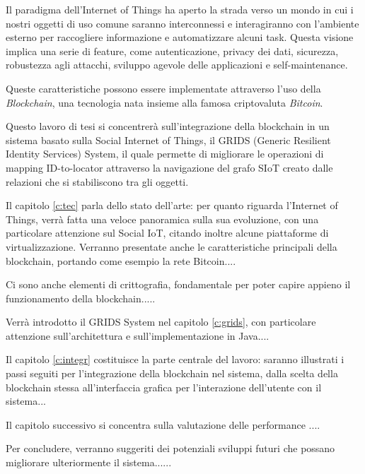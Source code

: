 Il paradigma dell'Internet of Things ha aperto la strada verso un mondo in cui i nostri oggetti di uso comune saranno interconnessi e interagiranno con l'ambiente esterno per raccogliere informazione e automatizzare alcuni task. Questa visione implica una serie di feature, come autenticazione, privacy dei dati, sicurezza, robustezza agli attacchi, sviluppo agevole delle applicazioni e self-maintenance.\cite{Fernandez-Carames2018}

Queste caratteristiche possono essere implementate attraverso l'uso della \textit{Blockchain}, una tecnologia nata insieme alla famosa criptovaluta \textit{Bitcoin}. 


Questo lavoro di tesi si concentrerà sull'integrazione della blockchain in un sistema basato sulla Social Internet of Things, il GRIDS (Generic Resilient Identity Services) System, il quale permette di migliorare le operazioni di mapping ID-to-locator attraverso la navigazione del grafo SIoT creato dalle relazioni che si stabiliscono tra gli oggetti.

Il capitolo \ref{c:tec} parla dello stato dell'arte: per quanto riguarda l'Internet of Things, verrà fatta una veloce panoramica sulla sua evoluzione, con una particolare attenzione sul Social IoT, citando inoltre alcune piattaforme di virtualizzazione. Verranno presentate anche le caratteristiche principali della blockchain, portando come esempio la rete Bitcoin.... 

Ci sono anche elementi di crittografia, fondamentale per poter capire appieno il funzionamento della blockchain.....

Verrà introdotto il GRIDS System nel capitolo \ref{c:grids}, con particolare attenzione sull'architettura e sull'implementazione in Java....

Il capitolo \ref{c:integr} costituisce la parte centrale del lavoro: saranno illustrati i passi seguiti per l'integrazione della blockchain nel sistema, dalla scelta della blockchain stessa all'interfaccia grafica per l'interazione dell'utente con il sistema...

Il capitolo successivo si concentra sulla valutazione delle performance ....

Per concludere, verranno suggeriti dei potenziali sviluppi futuri che possano migliorare ulteriormente il sistema......